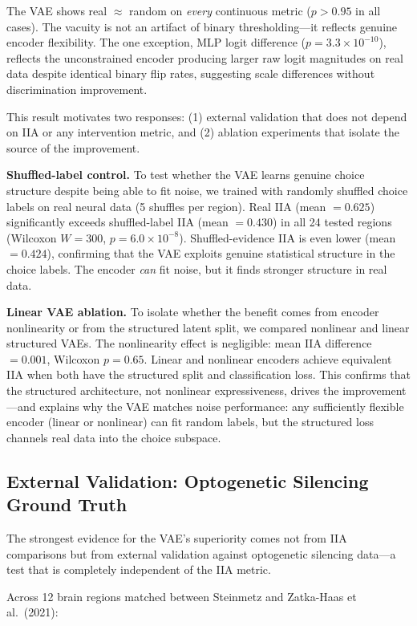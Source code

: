 \documentclass{article}
\begin{document}
The VAE shows real $\approx$ random on \emph{every} continuous metric ($p > 0.95$ in all cases). The vacuity is not an artifact of binary thresholding---it reflects genuine encoder flexibility. The one exception, MLP logit difference ($p = 3.3 \times 10^{-10}$), reflects the unconstrained encoder producing larger raw logit magnitudes on real data despite identical binary flip rates, suggesting scale differences without discrimination improvement.

This result motivates two responses: (1) external validation that does not depend on IIA or any intervention metric, and (2) ablation experiments that isolate the source of the improvement.

\textbf{Shuffled-label control.} To test whether the VAE learns genuine choice structure despite being able to fit noise, we trained with randomly shuffled choice labels on real neural data (5 shuffles per region). Real IIA (mean $= 0.625$) significantly exceeds shuffled-label IIA (mean $= 0.430$) in all 24 tested regions (Wilcoxon $W = 300$, $p = 6.0 \times 10^{-8}$). Shuffled-evidence IIA is even lower (mean $= 0.424$), confirming that the VAE exploits genuine statistical structure in the choice labels. The encoder \emph{can} fit noise, but it finds stronger structure in real data.

\textbf{Linear VAE ablation.} To isolate whether the benefit comes from encoder nonlinearity or from the structured latent split, we compared nonlinear and linear structured VAEs. The nonlinearity effect is negligible: mean IIA difference $= 0.001$, Wilcoxon $p = 0.65$. Linear and nonlinear encoders achieve equivalent IIA when both have the structured split and classification loss. This confirms that the structured architecture, not nonlinear expressiveness, drives the improvement---and explains why the VAE matches noise performance: any sufficiently flexible encoder (linear or nonlinear) can fit random labels, but the structured loss channels real data into the choice subspace.

\subsection{External Validation: Optogenetic Silencing Ground Truth}

The strongest evidence for the VAE's superiority comes not from IIA comparisons but from external validation against optogenetic silencing data---a test that is completely independent of the IIA metric.

Across 12 brain regions matched between Steinmetz and Zatka-Haas et al.\ (2021):
\end{document}
